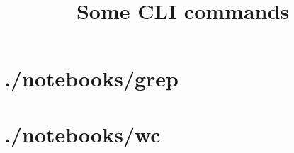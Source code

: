 \title{Some CLI commands}

\maketitle
\clearpage
\section*{./notebooks/grep}

\clearpage
\section*{./notebooks/wc}


